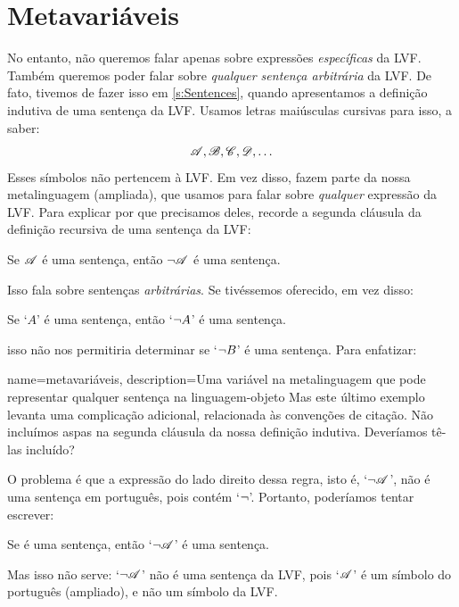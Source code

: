 \section{Metavariáveis}\label{s:Metavariables}
No entanto, não queremos falar apenas sobre expressões \emph{específicas}
da LVF. Também queremos poder falar sobre
\emph{qualquer sentença arbitrária} da LVF. De fato, tivemos de fazer isso
em \cref{s:Sentences}, quando apresentamos a definição indutiva de uma
sentença da LVF. Usamos letras maiúsculas cursivas para isso, a saber:
	$$\mathscr{A}, \mathscr{B}, \mathscr{C}, \mathscr{D}, \ldots$$
Esses símbolos não pertencem à LVF. Em vez disso, fazem parte da nossa
metalinguagem (ampliada), que usamos para falar sobre \emph{qualquer}
expressão da LVF. Para explicar por que precisamos deles, recorde a segunda
cláusula da definição recursiva de uma sentença da LVF:
	\begin{compactlist}
		\item[2.] Se $\mathscr{A}$ é uma sentença, então $\neg \mathscr{A}$ é uma sentença.
	\end{compactlist}
Isso fala sobre sentenças \emph{arbitrárias}. Se tivéssemos oferecido, em
vez disso:
	\begin{compactlist}
		\item[2$'$.] Se `$A$' é uma sentença, então `$\neg A$' é uma sentença.
	\end{compactlist}
isso não nos permitiria determinar se `$\neg B$' é uma sentença. Para
enfatizar:

{
name=metavariáveis,
description={Uma variável na metalinguagem que pode representar qualquer sentença na linguagem-objeto}
}
Mas este último exemplo levanta uma complicação adicional, relacionada às
convenções de citação. Não incluímos aspas na segunda cláusula da nossa
definição indutiva. Deveríamos tê-las incluído?

O problema é que a expressão do lado direito dessa regra, isto é,
`$\neg\mathscr{A}$', não é uma sentença em português, pois contém
`$\neg$'. Portanto, poderíamos tentar escrever:
	\begin{numberlist}
		\item[2$''$.] Se  é uma sentença, então `$\neg \mathscr{A}$' é uma sentença.
	\end{numberlist}
Mas isso não serve: `$\neg \mathscr{A}$' não é uma sentença da LVF, pois
`$\mathscr{A}$' é um símbolo do português (ampliado), e não um símbolo da
LVF.

